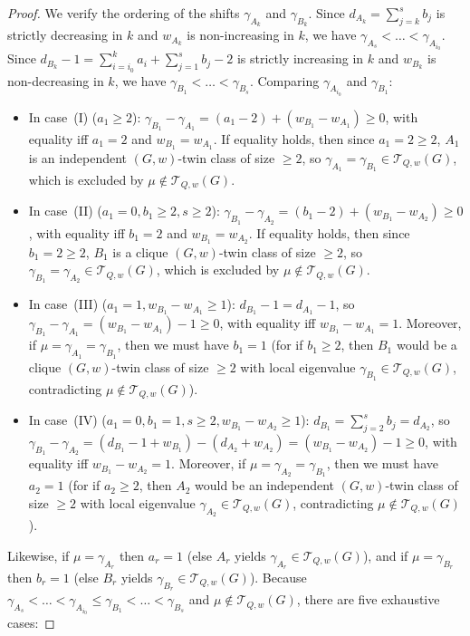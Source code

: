 \documentclass[11pt,a4paper]{article}
\theoremstyle{definition}
\begin{document}
\begin{proof}
  We verify the ordering of the shifts $\gamma_{A_k}$ and $\gamma_{B_k}$. Since $d_{A_k} = \sum_{j=k}^s b_j$ is strictly decreasing in $k$ and $w_{A_k}$ is non-increasing in $k$, we have $\gamma_{A_s} < \dots < \gamma_{A_{i_0}}$. Since $d_{B_k} - 1 = \sum_{i=i_0}^k a_i + \sum_{j=1}^s b_j - 2$ is strictly increasing in $k$ and $w_{B_k}$ is non-decreasing in $k$, we have $\gamma_{B_1} < \dots < \gamma_{B_s}$. Comparing $\gamma_{A_{i_0}}$ and $\gamma_{B_1}$:
  \begin{itemize}
    \item In case~(I) ($a_1 \ge 2$): $\gamma_{B_1} - \gamma_{A_1} = (a_1 - 2) + (w_{B_1} - w_{A_1}) \ge 0$, with equality iff $a_1 = 2$ and $w_{B_1} = w_{A_1}$. If equality holds, then since $a_1 = 2 \ge 2$, $A_1$ is an independent $(G,w)$-twin class of size $\ge 2$, so $\gamma_{A_1} = \gamma_{B_1} \in \mathcal{T}_{Q,w}(G)$, which is excluded by $\mu \notin \mathcal{T}_{Q,w}(G)$.
    \item In case~(II) ($a_1 = 0, b_1 \ge 2, s \ge 2$): $\gamma_{B_1} - \gamma_{A_2} = (b_1 - 2) + (w_{B_1} - w_{A_2}) \ge 0$, with equality iff $b_1 = 2$ and $w_{B_1} = w_{A_2}$. If equality holds, then since $b_1 = 2 \ge 2$, $B_1$ is a clique $(G,w)$-twin class of size $\ge 2$, so $\gamma_{B_1} = \gamma_{A_2} \in \mathcal{T}_{Q,w}(G)$, which is excluded by $\mu \notin \mathcal{T}_{Q,w}(G)$.
    \item In case~(III) ($a_1 = 1, w_{B_1} - w_{A_1} \ge 1$): $d_{B_1} - 1 = d_{A_1} - 1$, so $\gamma_{B_1} - \gamma_{A_1} = (w_{B_1} - w_{A_1}) - 1 \ge 0$, with equality iff $w_{B_1} - w_{A_1} = 1$. Moreover, if $\mu = \gamma_{A_1} = \gamma_{B_1}$, then we must have $b_1 = 1$ (for if $b_1 \ge 2$, then $B_1$ would be a clique $(G,w)$-twin class of size $\ge 2$ with local eigenvalue $\gamma_{B_1} \in \mathcal{T}_{Q,w}(G)$, contradicting $\mu \notin \mathcal{T}_{Q,w}(G)$).
    \item In case~(IV) ($a_1 = 0, b_1 = 1, s \ge 2, w_{B_1} - w_{A_2} \ge 1$): $d_{B_1} = \sum_{j=2}^s b_j = d_{A_2}$, so $\gamma_{B_1} - \gamma_{A_2} = (d_{B_1} - 1 + w_{B_1}) - (d_{A_2} + w_{A_2}) = (w_{B_1} - w_{A_2}) - 1 \ge 0$, with equality iff $w_{B_1} - w_{A_2} = 1$. Moreover, if $\mu = \gamma_{A_2} = \gamma_{B_1}$, then we must have $a_2 = 1$ (for if $a_2 \ge 2$, then $A_2$ would be an independent $(G,w)$-twin class of size $\ge 2$ with local eigenvalue $\gamma_{A_2} \in \mathcal{T}_{Q,w}(G)$, contradicting $\mu \notin \mathcal{T}_{Q,w}(G)$).
  \end{itemize}
  Likewise, if $\mu = \gamma_{A_r}$ then $a_r = 1$ (else $A_r$ yields $\gamma_{A_r} \in \mathcal{T}_{Q,w}(G)$), and if $\mu = \gamma_{B_r}$ then $b_r = 1$ (else $B_r$ yields $\gamma_{B_r} \in \mathcal{T}_{Q,w}(G)$). Because $\gamma_{A_s} < \dots < \gamma_{A_{i_0}} \le \gamma_{B_1} < \dots < \gamma_{B_s}$ and $\mu \notin \mathcal{T}_{Q,w}(G)$, there are five exhaustive cases:

\end{proof}
\end{document}
